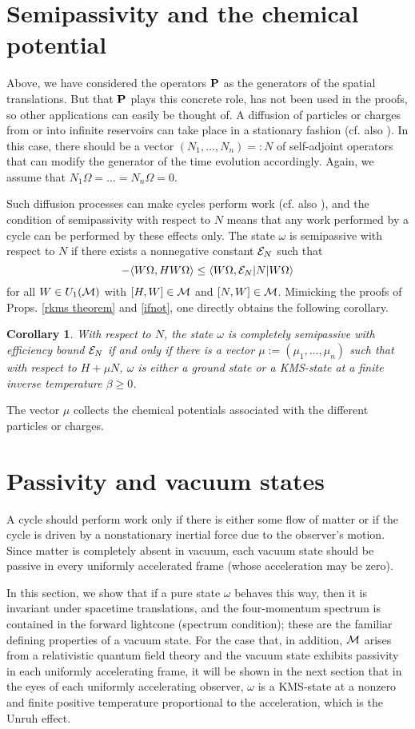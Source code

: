 \documentclass[a4paper,11pt]{article}
\newtheorem{corollary}[theorem]{Corollary}{\bf}{\it}
\def\dt{\cal}
\def\dM{{\dt M}}
\def\E{{\cal E}}
\def\gO{\Omega}
\def\go{\omega}
\begin{document}
\section{Semipassivity and the chemical potential}\label{chemical potential}
Above, we have considered the operators ${\bf P}$ as the generators
of the spatial translations.
But that ${\bf P}$ plays this concrete role,
has not been used in the proofs, so
other applications can easily be thought of. A
diffusion of particles or charges from or into infinite reservoirs
can take place in a stationary fashion (cf. also \cite{Rue00,GL00,
AHKT,Haa92,Kas76}). In this case, there should be
a vector $(N_1,\dots,N_n)=:N$ of self-adjoint
operators that can modify the generator of the time evolution
accordingly. Again, we assume that $N_1\gO=\dots=N_n\gO=0$.

Such diffusion processes can make cycles perform work
(cf. also \cite{Nar82}), and the condition
of semipassivity with respect to $N$
means that any work performed by a cycle
can be performed by these effects only. The state $\go$ is
semipassive with respect to $N$ if there exists a nonnegative constant
$\E_N$ such that
$$-\langle W\gO,HW\gO\rangle\leq\langle W\gO,\E_N|N|W\gO\rangle$$
for all $W\in U_1(\dM)$ with $[H,W]\in\dM$ and $[N,W]\in\dM$.
Mimicking the proofs of Props. \ref{rkms theorem} and \ref{ifnot},
one directly obtains the following corollary.
\begin{corollary}
With respect to $N$,
the state $\go$ is completely semipassive with efficiency bound
$\E_N$ if and only if there is a vector
$\mu:=(\mu_1,\dots,\mu_n)$ such that with respect to $H+\mu N$,
$\go$ is either a ground state or
a KMS-state at a finite inverse temperature
$\beta\geq0$.
\end{corollary}
The vector $\mu$ collects the chemical potentials associated with
the different particles or charges.

\section{Passivity and vacuum states}\label{vacuum}

A cycle should perform work only if there is either some flow of matter
or if the cycle is driven by a nonstationary inertial force due to the
observer's motion.
Since matter is completely absent in vacuum, each
vacuum state should be passive in every uniformly
accelerated frame (whose acceleration may be zero).

In this section, we show that if a pure state $\go$ behaves this way,
then it is invariant under spacetime translations, and the
four-momentum spectrum is contained in the forward lightcone
(spectrum condition); these are the familiar defining
properties of a vacuum state.
For the case that, in addition, $\dM$ arises from a
relativistic quantum field theory and the vacuum state exhibits passivity
in each uniformly accelerating frame, it will be shown in the next section
that in the eyes of each uniformly accelerating observer,
$\go$ is a KMS-state at
a nonzero and finite positive temperature proportional to the
acceleration, which is the Unruh effect.
\end{document}
